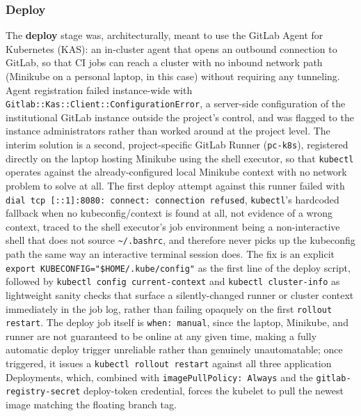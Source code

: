 \documentclass[twoside]{supsistudent}
\begin{document}
\subsubsection{Deploy}
The \textbf{deploy} stage was, architecturally, meant to use the GitLab Agent for Kubernetes (KAS): an in-cluster agent that opens an outbound connection to GitLab, so that CI jobs can reach a cluster with no inbound network path (Minikube on a personal laptop, in this case) without requiring any tunneling. Agent registration failed instance-wide with \\ \texttt{Gitlab::Kas::Client::ConfigurationError}, a server-side configuration of the institutional GitLab instance outside the project's control, and was flagged to the instance administrators rather than worked around at the project level. The interim solution is a second, project-specific GitLab Runner (\texttt{pc-k8s}), registered directly on the laptop hosting Minikube using the shell executor, so that \texttt{kubectl} operates against the already-configured local Minikube context with no network problem to solve at all. The first deploy attempt against this runner failed with \texttt{dial tcp [::1]:8080: connect: connection refused}, \texttt{kubectl}'s hardcoded fallback when no kubeconfig/context is found at all, not evidence of a wrong context, traced to the shell executor's job environment being a non-interactive shell that does not source \texttt{\textasciitilde/.bashrc}, and therefore never picks up the kubeconfig path the same way an interactive terminal session does. The fix is an explicit \\ \texttt{export KUBECONFIG="\$HOME/.kube/config"} as the first line of the deploy script, followed by \texttt{kubectl config current-context} and \texttt{kubectl cluster-info} as lightweight sanity checks that surface a silently-changed runner or cluster context immediately in the job log, rather than failing opaquely on the first \texttt{rollout restart}. The deploy job itself is \texttt{when: manual}, since the laptop, Minikube, and runner are not guaranteed to be online at any given time, making a fully automatic deploy trigger unreliable rather than genuinely unautomatable; once triggered, it issues a \texttt{kubectl rollout restart} against all three application Deployments, which, combined with \texttt{imagePullPolicy: Always} and the \texttt{gitlab-registry-secret} deploy-token credential, forces the kubelet to pull the newest image matching the floating branch tag.
\end{document}
